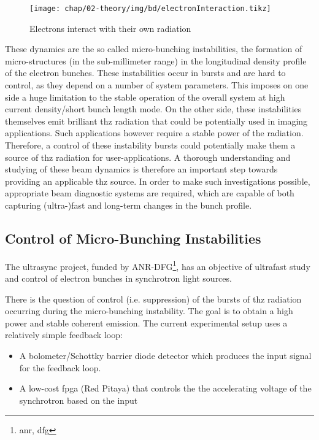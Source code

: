 \begin{figure}[tb]
	\centering
	\texttt{[image: chap/02-theory/img/bd/electronInteraction.tikz]}
	\caption{Electrons interact with their own radiation \cite{Bielawski2019}}
	\label{fig:electronInteract}
\end{figure}
These dynamics are the so called micro-bunching instabilities, the formation of micro-structures (in the sub-millimeter range) in the longitudinal density profile of the electron bunches.
These instabilities occur in bursts and are hard to control, as they depend on a number of system parameters.
This imposes on one side a huge limitation to the stable operation of the overall system at high current density/short bunch length mode.
On the other side, these instabilities themselves emit brilliant \gls{thz} radiation that could be potentially used in imaging applications.
Such applications however require a stable power of the radiation. 
Therefore, a control of these instability bursts could potentially make them a source of \gls{thz} radiation for user-applications. 
A thorough understanding and studying of these beam dynamics is therefore an important step towards providing an applicable \gls{thz} source. \cite{rota2018,brosi}
In order to make such investigations possible, appropriate beam diagnostic systems are required, which are capable of both capturing (ultra-)fast and long-term changes in the bunch profile.  

\subsection*{Control of Micro-Bunching Instabilities}
The \gls{ultrasync} project, funded by ANR-DFG\footnote{\gls{anr}, \gls{dfg}}, has an objective of ultrafast study and control of electron bunches in synchrotron light sources.

There is the question of control (i.e. suppression) of the bursts of \gls{thz} radiation occurring during the micro-bunching instability.
The goal is to obtain a high power and stable coherent emission. 
The current experimental setup uses a relatively simple feedback loop:
\begin{itemize}
	\item A bolometer/Schottky barrier diode detector which produces the input signal for the feedback loop.
	\item A low-cost \gls{fpga} (Red Pitaya) that controls the the accelerating voltage of the synchrotron based on the input
\end{itemize} %

